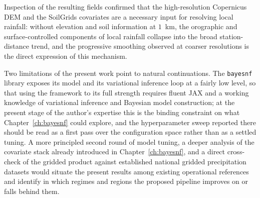 Inspection of the resulting fields confirmed that the high-resolution
Copernicus DEM and the SoilGrids covariates are a necessary input for
resolving local rainfall: without elevation and soil information at
$1$~km, the orographic and surface-controlled components of local
rainfall collapse into the broad station-distance trend, and the
progressive smoothing observed at coarser resolutions is the direct
expression of this mechanism.

Two limitations of the present work point to natural continuations.
The \texttt{bayesnf} library exposes its model and its variational
inference loop at a fairly low level, so that using the framework to
its full strength requires fluent JAX and a working knowledge of
variational inference and Bayesian model construction; at the present
stage of the author's expertise this is the binding constraint on what
Chapter~\ref{ch:bayesnf} could explore, and the hyperparameter sweep
reported there should be read as a first pass over the configuration
space rather than as a settled tuning. A more principled second round
of model tuning, a deeper analysis of the covariate stack already
introduced in Chapter~\ref{ch:bayesnf}, and a direct cross-check of
the gridded product against established national gridded precipitation
datasets would situate the present results among existing operational
references and identify in which regimes and regions the proposed
pipeline improves on or falls behind them.
